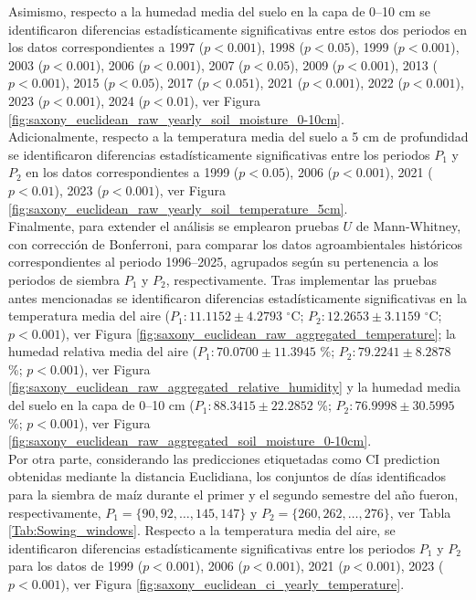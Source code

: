 Asimismo, respecto a la humedad media del suelo en la capa de 0--10 cm se identificaron diferencias estadísticamente significativas entre estos dos periodos en los datos correspondientes a 1997	($p<0.001$), 1998	($p<0.05$), 1999	($p<0.001$), 2003	($p<0.001$), 2006	($p<0.001$), 2007	($p<0.05$), 2009	($p<0.001$), 2013	($p<0.001$), 2015	($p<0.05$), 2017	($p<0.051$), 2021	($p<0.001$), 2022	($p<0.001$), 2023	($p<0.001$), 2024	($p<0.01$), ver Figura \ref{fig:saxony_euclidean_raw_yearly_soil_moisture_0-10cm}.\\

Adicionalmente, respecto a la temperatura media del suelo a 5 cm de profundidad se identificaron diferencias estadísticamente significativas entre los periodos $P_1$ y $P_2$ en los datos correspondientes a 1999	($p<0.05$), 2006	($p<0.001$), 2021	($p<0.01$), 2023	($p<0.001$), ver Figura \ref{fig:saxony_euclidean_raw_yearly_soil_temperature_5cm}.\\

Finalmente, para extender el análisis se emplearon pruebas $U$ de Mann-Whitney, con corrección de Bonferroni, para comparar los datos agroambientales históricos correspondientes al periodo 1996--2025, agrupados según su pertenencia a los periodos de siembra $P_1$ y $P_2$, respectivamente.  Tras implementar las pruebas antes mencionadas se identificaron diferencias estadísticamente significativas en la temperatura media del aire ($P_1:	11.1152	\pm	4.2793	$ $^\circ$C; 	$P_2:	12.2653	\pm	3.1159	$ $^\circ$C; 	$p<0.001$), ver Figura \ref{fig:saxony_euclidean_raw_aggregated_temperature}; la humedad relativa media del aire ($P_1:	70.0700	\pm	11.3945	$ \%; 	$P_2:	79.2241	\pm	8.2878	$ \%; 	$p<0.001$), ver Figura \ref{fig:saxony_euclidean_raw_aggregated_relative_humidity} y la humedad media del suelo en la capa de 0--10 cm  ($P_1:	88.3415	\pm	22.2852	$ \%; 	$P_2:	76.9998	\pm	30.5995	$ \%; 	$p<0.001$), ver Figura \ref{fig:saxony_euclidean_raw_aggregated_soil_moisture_0-10cm}.\\

Por otra parte, considerando las predicciones etiquetadas como CI prediction obtenidas mediante la distancia Euclidiana, los conjuntos de días identificados para la siembra de maíz durante el primer y el segundo semestre del año fueron, respectivamente, $P_1=\{90, 92,\ldots, 145, 147\}$ y $P_2=\{260, 262,\ldots,276\}$, ver Tabla \ref{Tab:Sowing_windows}. Respecto a la temperatura media del aire, se identificaron diferencias estadísticamente significativas entre los periodos $P_1$ y $P_2$ para los datos de 1999	($p<0.001$), 2006	($p<0.001$), 2021	($p<0.001$), 2023	($p<0.001$), ver Figura \ref{fig:saxony_euclidean_ci_yearly_temperature}.\\

